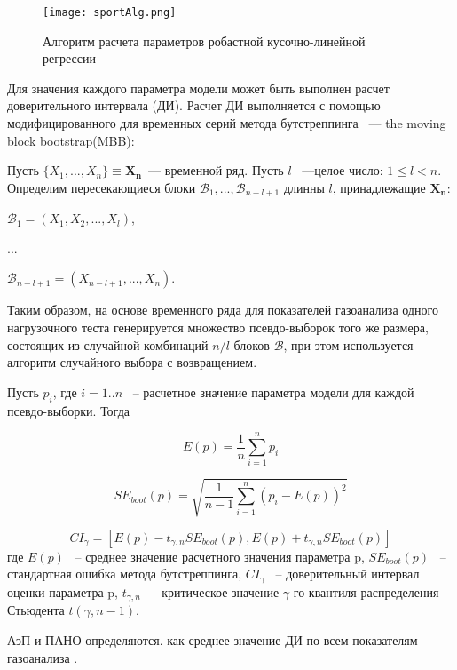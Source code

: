 \begin{figure}[!ht]
	\centering
	\texttt{[image: sportAlg.png]}
	\caption{Алгоритм расчета параметров робастной кусочно-линейной регрессии } 
\end{figure}

Для значения каждого параметра модели может быть выполнен расчет доверительного интервала (ДИ). Расчет ДИ выполняется с помощью модифицированного для временных серий метода бутстреппинга \cite{efron1988}~--- the moving block bootstrap(MBB): 

Пусть $\{X_{1},...,X_{n}\} \equiv \mathbf{X_{n}}$~--- временной ряд. Пусть $l$ ~---целое число: $1\le l<n$. Определим пересекающиеся блоки $\mathcal{B}_{1},...,\mathcal{B}_{n-l+1}$ длинны $l$, принадлежащие $\mathbf{X_{n}}$:

$\mathcal{B}_{1}=(X_{1},X_{2},...,X_{l})$,

...

$\mathcal{B}_{n-l+1}=(X_{n-l+1},...,X_{n})$.

Таким образом, на основе временного ряда для показателей газоанализа одного нагрузочного теста генерируется множество псевдо-выборок того же размера,
состоящих из случайной комбинаций $n/l$ блоков $\mathcal{B}$, при этом используется алгоритм случайного выбора с возвращением.

Пусть \(p_{i}\), где \(i=1..n\) ~-- расчетное значение параметра модели для каждой псевдо-выборки. Тогда

\begin{equation}
E(p)=\frac{1}{n}\sum_{i=1}^n p_{i}
\end{equation}

\begin{equation}
SE_{boot}(p)=\sqrt{\frac{1}{n-1}\sum_{i=1}^{n}\left(p_{i}-E(p)\right)^{2}}
\end{equation}

\begin{equation}
CI_{\gamma} = \left[E(p)-t_{\gamma,n}SE_{boot}(p), E(p)+t_{\gamma,n}SE_{boot}(p)\right]
\end{equation}
где \(E(p)\) ~-- среднее значение расчетного значения параметра p, \(SE_{boot}(p)\) ~-- стандартная ошибка метода бутстреппинга, \(CI_{\gamma}\) ~-- доверительный интервал оценки параметра p, \(t_{\gamma,n}\) ~-- критическое значение \(\gamma\)-го квантиля распределения Стьюдента \(t(\gamma, n-1)\).

АэП и ПАНО определяются. как среднее значение ДИ по всем показателям газоанализа \cite{GolovIt2017}.

